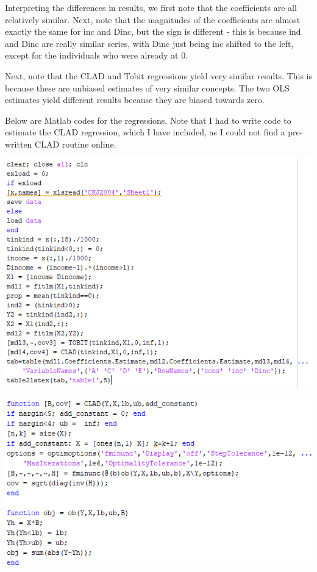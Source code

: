 \documentclass[11pt]{article} %
\begin{document}
Interpreting the differences in results, we first note that the coefficients are all relatively similar. Next, note that the magnitudes of the coefficients are almost exactly the same for inc and Dinc, but the sign is different - this is because ind and Dinc are really similar series, with Dinc just being inc shifted to the left, except for the individuals who were already at 0.

Next, note that the CLAD and Tobit regressions yield very similar results. This is because these are unbiased estimates of very similar concepts. The two OLS estimates yield different results because they are biased towards zero.

Below are Matlab codes for the regressions. Note that I had to write code to estimate the CLAD regression, which I have included, as I could not find a pre-written CLAD routine online.

\includegraphics{p1}

\includegraphics{p2}
\end{document}
